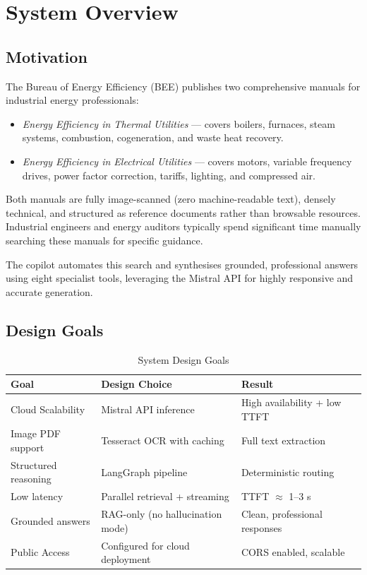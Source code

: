 \documentclass[12pt,a4paper]{report}
\begin{document}
\tableofcontents
\listoftables
\newpage

\chapter{System Overview}

\section{Motivation}

The Bureau of Energy Efficiency (BEE) publishes two comprehensive manuals for industrial energy professionals:

\begin{itemize}
  \item \textit{Energy Efficiency in Thermal Utilities} --- covers boilers, furnaces, steam systems, combustion, cogeneration, and waste heat recovery.
  \item \textit{Energy Efficiency in Electrical Utilities} --- covers motors, variable frequency drives, power factor correction, tariffs, lighting, and compressed air.
\end{itemize}

Both manuals are fully image-scanned (zero machine-readable text), densely technical, and structured as reference documents rather than browsable resources. Industrial engineers and energy auditors typically spend significant time manually searching these manuals for specific guidance.

The copilot automates this search and synthesises grounded, professional answers using eight specialist tools, leveraging the Mistral API for highly responsive and accurate generation.

\section{Design Goals}

\begin{table}[H]
\centering
\caption{System Design Goals}
\begin{tabular}{@{}lll@{}}
\toprule
\textbf{Goal} & \textbf{Design Choice} & \textbf{Result} \\
\midrule
Cloud Scalability & Mistral API inference & High availability + low TTFT \\
Image PDF support & Tesseract OCR with caching & Full text extraction \\
Structured reasoning & LangGraph pipeline & Deterministic routing \\
Low latency & Parallel retrieval + streaming & TTFT $\approx$ 1--3 s \\
Grounded answers & RAG-only (no hallucination mode) & Clean, professional responses \\
Public Access & Configured for cloud deployment & CORS enabled, scalable \\
\bottomrule
\end{tabular}
\end{table}
\end{document}
